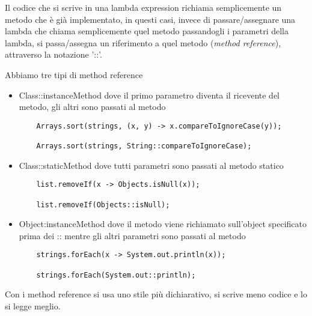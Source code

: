 Il codice che si scrive in una lambda expression richiama semplicemente un metodo che è già implementato, in questi casi, invece di passare/assegnare una lambda che 
chiama semplicemente quel metodo passandogli i parametri della lambda, si passa/assegna un riferimento a quel metodo (\textit{method reference}), attraverso la 
notazione '::'.

Abbiamo tre tipi di method reference
\begin{itemize}
    \item Class::instanceMethod dove il primo parametro diventa il ricevente del metodo, gli altri sono passati al metodo
    \begin{lstlisting}
    Arrays.sort(strings, (x, y) -> x.compareToIgnoreCase(y));

    Arrays.sort(strings, String::compareToIgnoreCase);
    \end{lstlisting}
    \item Class::staticMethod dove tutti parametri sono passati al metodo statico
    \begin{lstlisting}
    list.removeIf(x -> Objects.isNull(x));
    
    list.removeIf(Objects::isNull);
    \end{lstlisting}
    \item Object:instanceMethod dove il metodo viene richiamato sull’object specificato prima dei :: mentre gli altri parametri sono passati al metodo
    \begin{lstlisting}
    strings.forEach(x -> System.out.println(x));

    strings.forEach(System.out::println);
    \end{lstlisting}
\end{itemize}

Con i method reference si usa uno stile più dichiarativo, si scrive meno codice e lo si legge meglio.
